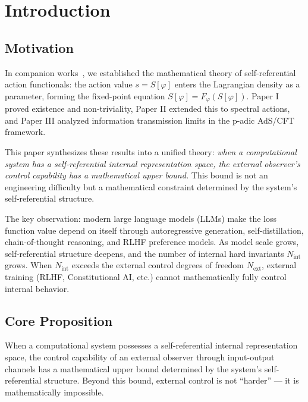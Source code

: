 \documentclass[12pt,a4paper]{article}
\theoremstyle{definition}
\newcommand{\Nint}{N_{\mathrm{int}}}
\newcommand{\Next}{N_{\mathrm{ext}}}
\begin{document}
\tableofcontents
\newpage

\section{Introduction}
\label{sec:intro}

\subsection{Motivation}

In companion works~\cite{PaperI, PaperII, PaperIII}, we established the mathematical theory of self-referential action functionals: the action value $s = S[\varphi]$ enters the Lagrangian density as a parameter, forming the fixed-point equation $S[\varphi] = F_\varphi(S[\varphi])$. Paper I proved existence and non-triviality, Paper II extended this to spectral actions, and Paper III analyzed information transmission limits in the p-adic AdS/CFT framework.

This paper synthesizes these results into a unified theory: \emph{when a computational system has a self-referential internal representation space, the external observer's control capability has a mathematical upper bound.} This bound is not an engineering difficulty but a mathematical constraint determined by the system's self-referential structure.

The key observation: modern large language models (LLMs) make the loss function value depend on itself through autoregressive generation, self-distillation, chain-of-thought reasoning, and RLHF preference models. As model scale grows, self-referential structure deepens, and the number of internal hard invariants $\Nint$ grows. When $\Nint$ exceeds the external control degrees of freedom $\Next$, external training (RLHF, Constitutional AI, etc.) cannot mathematically fully control internal behavior.

\subsection{Core Proposition}

\begin{framed}
When a computational system possesses a self-referential internal representation space, the control capability of an external observer through input-output channels has a mathematical upper bound determined by the system's self-referential structure. Beyond this bound, external control is not ``harder'' --- it is mathematically impossible.
\end{framed}
\end{document}
